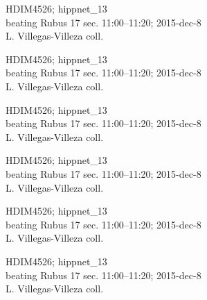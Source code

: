 \documentclass[2pt]{extarticle}
\begin{document}
\noindent
\parbox{0.16\textwidth}{\tiny \raggedright \rule[-0.3\baselineskip]{0pt}{10pt}HDIM4526; hippnet\_13\\ beating Rubus 17 sec. 11:00--11:20; 2015-dec-8\\ L. Villegas-Villeza coll.}
\parbox{0.16\textwidth}{\tiny \raggedright \rule[-0.3\baselineskip]{0pt}{10pt}HDIM4526; hippnet\_13\\ beating Rubus 17 sec. 11:00--11:20; 2015-dec-8\\ L. Villegas-Villeza coll.}
\parbox{0.16\textwidth}{\tiny \raggedright \rule[-0.3\baselineskip]{0pt}{10pt}HDIM4526; hippnet\_13\\ beating Rubus 17 sec. 11:00--11:20; 2015-dec-8\\ L. Villegas-Villeza coll.}
\parbox{0.16\textwidth}{\tiny \raggedright \rule[-0.3\baselineskip]{0pt}{10pt}HDIM4526; hippnet\_13\\ beating Rubus 17 sec. 11:00--11:20; 2015-dec-8\\ L. Villegas-Villeza coll.}
\parbox{0.16\textwidth}{\tiny \raggedright \rule[-0.3\baselineskip]{0pt}{10pt}HDIM4526; hippnet\_13\\ beating Rubus 17 sec. 11:00--11:20; 2015-dec-8\\ L. Villegas-Villeza coll.}
\parbox{0.16\textwidth}{\tiny \raggedright \rule[-0.3\baselineskip]{0pt}{10pt}HDIM4526; hippnet\_13\\ beating Rubus 17 sec. 11:00--11:20; 2015-dec-8\\ L. Villegas-Villeza coll.} \\ 
\vspace{0.001in} 
\end{document}
